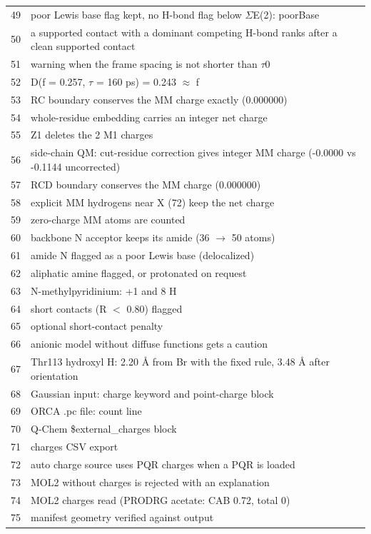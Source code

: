 \documentclass[journal=jcisd8,manuscript=suppinfo]{achemso}
\begin{document}
\begin{singlespace}
{\begin{longtable}{rp{14.5cm}}
49 & poor Lewis base flag kept, no H-bond flag below $\Sigma$E(2): poorBase\\
50 & a supported contact with a dominant competing H-bond ranks after a clean supported contact\\
51 & warning when the frame spacing is not shorter than $\tau$0\\
52 & D(f = 0.257, $\tau$ = 160 ps) = 0.243 $\approx$ f\\
53 & RC boundary conserves the MM charge exactly (0.000000)\\
54 & whole-residue embedding carries an integer net charge\\
55 & Z1 deletes the 2 M1 charges\\
56 & side-chain QM: cut-residue correction gives integer MM charge (-0.0000 vs -0.1144 uncorrected)\\
57 & RCD boundary conserves the MM charge (0.000000)\\
58 & explicit MM hydrogens near X (72) keep the net charge\\
59 & zero-charge MM atoms are counted\\
60 & backbone N acceptor keeps its amide (36 $\to$ 50 atoms)\\
61 & amide N flagged as a poor Lewis base (delocalized)\\
62 & aliphatic amine flagged, or protonated on request\\
63 & N-methylpyridinium: +1 and 8 H\\
64 & short contacts (R $<$ 0.80) flagged\\
65 & optional short-contact penalty\\
66 & anionic model without diffuse functions gets a caution\\
67 & Thr113 hydroxyl H: 2.20 \AA{} from Br with the fixed rule, 3.48 \AA{} after orientation\\
68 & Gaussian input: charge keyword and point-charge block\\
69 & ORCA .pc file: count line\\
70 & Q-Chem \$external\_charges block\\
71 & charges CSV export\\
72 & auto charge source uses PQR charges when a PQR is loaded\\
73 & MOL2 without charges is rejected with an explanation\\
74 & MOL2 charges read (PRODRG acetate: CAB 0.72, total 0)\\
75 & manifest geometry verified against output\\

\end{longtable}}
\end{singlespace}
\end{document}
